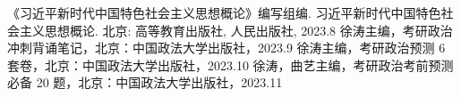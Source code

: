\documentclass[UTF8,10pt]{ctexbook} %
\begin{document}








\newpage
\begin{thebibliography}{1}
  《习近平新时代中国特色社会主义思想概论》编写组编. 习近平新时代中国特色社会主义思想概论.
  北京: 高等教育出版社, 人民出版社, 2023.8
  徐涛主编，考研政治冲刺背诵笔记，北京：中国政法大学出版社，2023.9
  徐涛主编，考研政治预测 6 套卷，北京：中国政法大学出版社，2023.10
  徐涛，曲艺主编，考研政治考前预测必备 20 题，北京：中国政法大学出版社，2023.11
\end{thebibliography}


\end{document}
